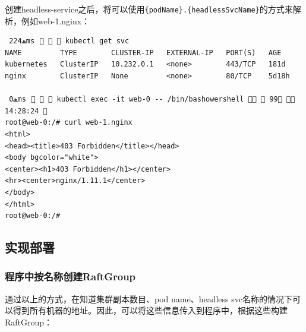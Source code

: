 \documentclass[12pt]{article}
\begin{document}
创建headless-service之后，将可以使用\texttt{\{podName\}.\{headlessSvcName\}}的方式来解析，例如web-1.nginx：

\begin{verbatim}
 ﮫ224ms⠀   kubectl get svc
NAME         TYPE        CLUSTER-IP   EXTERNAL-IP   PORT(S)   AGE
kubernetes   ClusterIP   10.232.0.1   <none>        443/TCP   181d
nginx        ClusterIP   None         <none>        80/TCP    5d18h

 ﮫ0ms⠀   kubectl exec -it web-0 -- /bin/bashowershell   99  14:28:24 
root@web-0:/# curl web-1.nginx
<html>
<head><title>403 Forbidden</title></head>
<body bgcolor="white">
<center><h1>403 Forbidden</h1></center>
<hr><center>nginx/1.11.1</center>
</body>
</html>
root@web-0:/#
\end{verbatim}

\subsection{实现部署}\label{ux5b9eux73b0ux90e8ux7f72}

\subsubsection{程序中按名称创建RaftGroup}\label{ux7a0bux5e8fux4e2dux6309ux540dux79f0ux521bux5efaraftgroup}

通过以上的方式，在知道集群副本数目、pod name、headless svc名称的情况下可以得到所有机器的地址。因此，可以将这些信息传入到程序中，根据这些构建RaftGroup：

\begin{Shaded}
\begin{Highlighting}[]
\KeywordTok{:}
\AttributeTok{  }\KeywordTok{:}\AttributeTok{ }
\AttributeTok{  }\KeywordTok{:}
\AttributeTok{  }\KeywordTok{:}
\AttributeTok{  }\KeywordTok{:}
\AttributeTok{    }\KeywordTok{:}\AttributeTok{ }
\AttributeTok{    }\KeywordTok{:}
\AttributeTok{    }\KeywordTok{:}\AttributeTok{ }
\end{Highlighting}
\end{Shaded}
\end{document}
